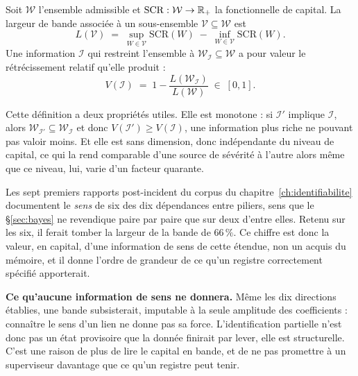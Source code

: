 \begin{definition}\label{def:voi}
Soit $\mathcal{W}$ l'ensemble admissible et $\mathrm{SCR}:\mathcal{W}\to\mathbb{R}_+$ la fonctionnelle de
capital. La largeur de bande associée à un sous-ensemble $\mathcal{V}\subseteq\mathcal{W}$ est
\begin{equation}
  L(\mathcal{V}) \;=\; \sup_{W\in\mathcal{V}}\mathrm{SCR}(W)\;-\;\inf_{W\in\mathcal{V}}\mathrm{SCR}(W).
  \label{eq:largeur-bande}
\end{equation}
Une information $\mathcal{I}$ qui restreint l'ensemble à $\mathcal{W}_{\mathcal{I}}\subseteq
\mathcal{W}$ a pour valeur le rétrécissement relatif qu'elle produit :
\begin{equation}
  V(\mathcal{I}) \;=\; 1-\frac{L(\mathcal{W}_{\mathcal{I}})}{L(\mathcal{W})} \;\in\;[0,1].
  \label{eq:voi}
\end{equation}
\end{definition}

Cette définition a deux propriétés utiles. Elle est monotone : si
$\mathcal{I}'$ implique $\mathcal{I}$, alors $\mathcal{W}_{\mathcal{I}'}\subseteq
\mathcal{W}_{\mathcal{I}}$ et donc $V(\mathcal{I}')\ge V(\mathcal{I})$, une information plus
riche ne pouvant pas valoir moins. Et elle est sans dimension, donc indépendante du
niveau de capital, ce qui la rend comparable d'une source de sévérité à l'autre alors même que
ce niveau, lui, varie d'un facteur quarante.

Les sept premiers rapports post-incident du corpus du chapitre~\ref{ch:identifiabilite} documentent le
\emph{sens} de six des dix dépendances entre piliers, sens que le \S\ref{sec:bayes} ne revendique
paire par paire que sur deux d'entre elles. Retenu sur les six, il ferait tomber la largeur de la
bande de $66\,\%$. Ce chiffre est donc la valeur, en capital, d'une information de sens de cette
étendue, non un acquis du mémoire, et il donne l'ordre de grandeur de ce qu'un registre
correctement spécifié apporterait.

\begin{attention}
\textbf{Ce qu'aucune information de sens ne donnera.} Même les dix directions établies, une bande
subsisterait, imputable à la seule amplitude des coefficients : connaître le sens d'un
lien ne donne pas sa force. L'identification partielle n'est donc pas un état provisoire que la
donnée finirait par lever, elle est structurelle. C'est une raison de plus de lire le
capital en bande, et de ne pas promettre à un superviseur davantage que ce qu'un registre peut
tenir.
\end{attention}

